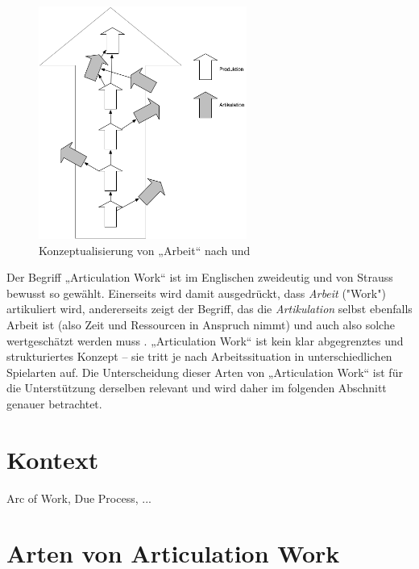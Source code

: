 \begin{figure}[htbp]
	\centering
		\includegraphics[height=3in]{img/ArticulationWork/ArtikulationProduktion.png}
	\caption{Konzeptualisierung von „Arbeit“ nach \citep{Strauss85} und \citep{Fujimura87}}
	\label{fig:img_ArticulationWork_ArtikulationProduktion}
\end{figure}

Der Begriff „Articulation Work“ ist im Englischen zweideutig und von Strauss bewusst so gewählt. Einerseits wird damit ausgedrückt, dass \emph{Arbeit} ("Work") artikuliert wird, andererseits zeigt der Begriff, das die \emph{Artikulation} selbst ebenfalls Arbeit ist (also Zeit und Ressourcen in Anspruch nimmt) und auch also solche wertgeschätzt werden muss \citep{Fujimura87}. „Articulation Work“ ist kein klar abgegrenztes und strukturiertes Konzept – sie tritt je nach Arbeitssituation in unterschiedlichen Spielarten auf. Die Unterscheidung dieser Arten von „Articulation Work“ ist für die Unterstützung derselben relevant und wird daher im folgenden Abschnitt genauer betrachtet.

\section{Kontext} %
\label{sec:kontext}
Arc of Work, Due Process, ...

\section{Arten von Articulation Work} %
\label{sec:arten_von_articulation_work}

